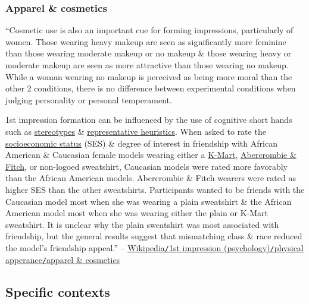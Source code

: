 \documentclass[oneside]{book}
\numberwithin{equation}{section}
\begin{document}
\subsubsection{Apparel \& cosmetics}
``Cosmetic use is also an important cue for forming impressions, particularly of women. Those wearing heavy makeup are seen as significantly more feminine than those wearing moderate makeup or no makeup \& those wearing heavy or moderate makeup are seen as more attractive than those wearing no makeup. While a woman wearing no makeup is perceived as being more moral than the other 2 conditions, there is no difference between experimental conditions when judging personality or personal temperament.

1st impression formation can be influenced by the use of cognitive short hands such as \href{https://en.wikipedia.org/wiki/Stereotypes}{stereotypes} \& \href{https://en.wikipedia.org/wiki/Representative_heuristic}{representative heuristics}. When asked to rate the \href{https://en.wikipedia.org/wiki/Socioeconomic_status}{socioeconomic status} (SES) \& degree of interest in friendship with African American \& Caucasian female models wearing either a \href{https://en.wikipedia.org/wiki/Kmart_(United_States)}{K-Mart}, \href{https://en.wikipedia.org/wiki/Abercrombie_%26_Fitch}{Abercrombie \& Fitch}, or non-logoed sweatshirt, Caucasian models were rated more favorably than the African American models. Abercrombie \& Fitch wearers were rated as higher SES than the other sweatshirts. Participants wanted to be friends with the Caucasian model most when she was wearing a plain sweatshirt \& the African American model most when she was wearing either the plain or K-Mart sweatshirt. It is unclear why the plain sweatshirt was most associated with friendship, but the general results suggest that mismatching class \& race reduced the model's friendship appeal.'' -- \href{https://en.wikipedia.org/wiki/First_impression_(psychology)#Apparel_and_cosmetics}{Wikipedia\texttt{/}1st impression (psychology)\texttt{/}physical apperance\texttt{/}apparel \& cosmetics}

\subsection{Specific contexts}
\end{document}
